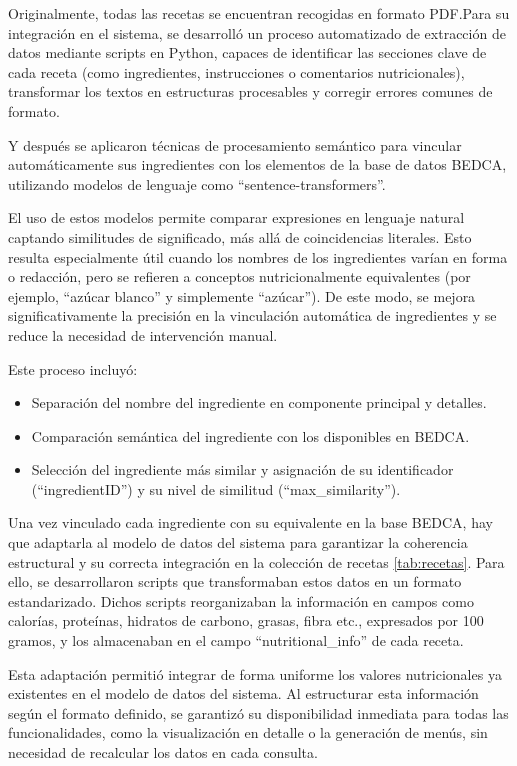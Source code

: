 Originalmente, todas las recetas se encuentran recogidas en formato PDF.Para su integración en el sistema, se desarrolló un proceso automatizado de extracción de datos mediante scripts en Python, capaces de identificar las secciones clave de cada receta (como ingredientes, instrucciones o comentarios nutricionales), transformar los textos en estructuras procesables y corregir errores comunes de formato. 

Y después se aplicaron técnicas de procesamiento semántico para vincular automáticamente sus ingredientes con los elementos de la base de datos BEDCA, utilizando modelos de lenguaje como ``sentence-transformers''. 

El uso de estos modelos permite comparar expresiones en lenguaje natural captando similitudes de significado, más allá de coincidencias literales.
Esto resulta especialmente útil cuando los nombres de los ingredientes varían en forma o redacción, pero se refieren a conceptos nutricionalmente equivalentes (por ejemplo, ``azúcar blanco'' y simplemente ``azúcar''). De este modo, se mejora significativamente la precisión en la vinculación automática de ingredientes y se reduce la necesidad de intervención manual.

Este proceso incluyó:
\begin{itemize}
    \item Separación del nombre del ingrediente en componente principal y detalles.
    \item Comparación semántica del ingrediente con los disponibles en BEDCA.
    \item Selección del ingrediente más similar y asignación de su identificador (``ingredientID'') y su nivel de similitud (``max\_similarity'').
\end{itemize}

Una vez vinculado cada ingrediente con su equivalente en la base BEDCA, hay que adaptarla al modelo de datos del sistema para garantizar la coherencia estructural y su correcta integración en la colección de recetas \ref{tab:recetas}. Para ello, se desarrollaron scripts que transformaban estos datos en un formato estandarizado. Dichos scripts reorganizaban la información en campos como calorías, proteínas, hidratos de carbono, grasas, fibra etc., expresados por 100 gramos, y los almacenaban en el campo ``nutritional\_info'' de cada receta.

Esta adaptación permitió integrar de forma uniforme los valores nutricionales ya existentes en el modelo de datos del sistema. Al estructurar esta información según el formato definido, se garantizó su disponibilidad inmediata para todas las funcionalidades, como la visualización en detalle o la generación de menús, sin necesidad de recalcular los datos en cada consulta.


